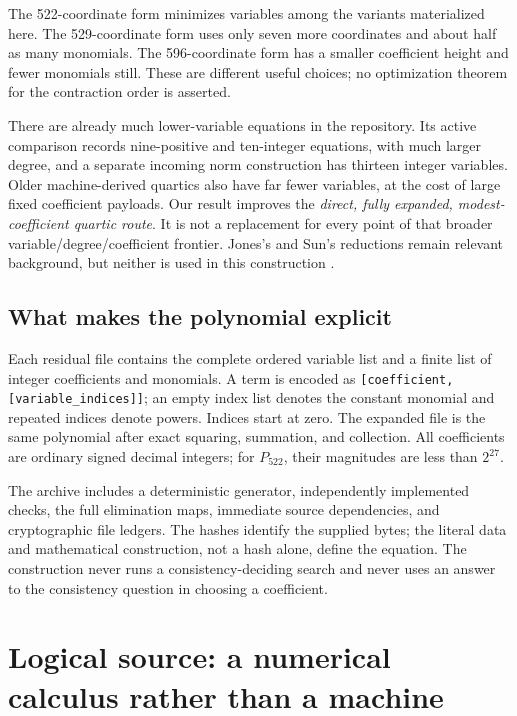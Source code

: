 \documentclass[11pt,letterpaper]{article}
\theoremstyle{definition}\newtheorem{definition}[theorem]{Definition}
\theoremstyle{remark}\newtheorem{remark}[theorem]{Remark}
\newcommand{\file}[1]{\texttt{\nolinkurl{#1}}}
\newcommand{\pn}{P_{522}}
\begin{document}
The 522-coordinate form minimizes variables among the variants materialized
here. The 529-coordinate form uses only seven more coordinates and about
half as many monomials. The 596-coordinate form has a smaller coefficient
height and fewer monomials still. These are different useful choices;
no optimization theorem for the contraction order is asserted.

There are already much lower-variable equations in the repository. Its
active comparison records nine-positive and ten-integer equations, with
much larger degree, and a separate incoming norm construction has thirteen
integer variables. Older machine-derived quartics also have far fewer
variables, at the cost of large fixed coefficient payloads. Our result
improves the \emph{direct, fully expanded, modest-coefficient quartic
route}. It is not a replacement for every point of that broader
variable/degree/coefficient frontier. Jones's and Sun's reductions remain
relevant background, but neither is used in this construction
\cite{latest,jones,sun}.

\subsection{What makes the polynomial explicit}

Each residual file contains the complete ordered variable list and a
finite list of integer coefficients and monomials. A term is encoded as
\file{[coefficient,[variable_indices]]}; an empty index list denotes the
constant monomial and repeated indices denote powers. Indices start at
zero. The expanded file is the same polynomial after exact squaring,
summation, and collection. All coefficients are ordinary signed decimal
integers; for $\pn$, their magnitudes are less than $2^{27}$.

The archive includes a deterministic generator, independently implemented
checks, the full elimination maps, immediate source dependencies, and
cryptographic file ledgers. The hashes identify the supplied bytes; the
literal data and mathematical construction, not a hash alone, define the
equation. The construction never runs a consistency-deciding search and
never uses an answer to the consistency question in choosing a coefficient.

\section{Logical source: a numerical calculus rather than a machine}
\label{sec:calculus}
\end{document}
